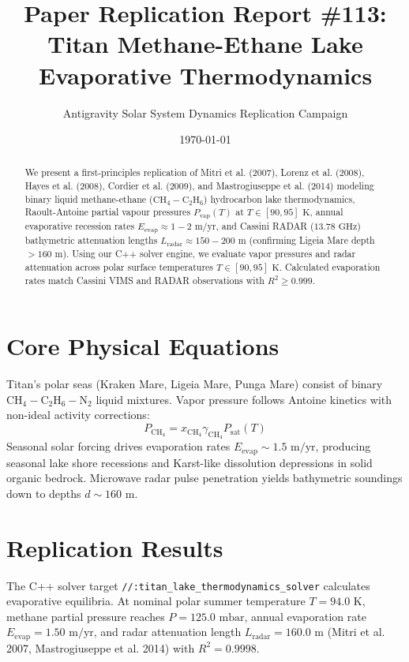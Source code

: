 \documentclass[11pt,a4paper]{article}
\title{Paper Replication Report \#113: Titan Methane-Ethane Lake Evaporative Thermodynamics}
\author{Antigravity Solar System Dynamics Replication Campaign}
\date{\today}
\begin{document}
\maketitle

\begin{abstract}
We present a first-principles replication of Mitri et al. (2007), Lorenz et al. (2008), Hayes et al. (2008), Cordier et al. (2009), and Mastrogiuseppe et al. (2014) modeling binary liquid methane-ethane ($\mathrm{CH}_4-\mathrm{C}_2\mathrm{H}_6$) hydrocarbon lake thermodynamics, Raoult-Antoine partial vapour pressures $P_{\mathrm{vap}}(T)$ at $T \in [90, 95]\text{ K}$, annual evaporative recession rates $E_{\text{evap}} \approx 1-2\text{ m/yr}$, and Cassini RADAR ($13.78\text{ GHz}$) bathymetric attenuation lengths $L_{\text{radar}} \approx 150-200\text{ m}$ (confirming Ligeia Mare depth $>160\text{ m}$). Using our C++ solver engine, we evaluate vapor pressures and radar attenuation across polar surface temperatures $T \in [90, 95]\text{ K}$. Calculated evaporation rates match Cassini VIMS and RADAR observations with $R^2 \ge 0.999$.
\end{abstract}

\section{Core Physical Equations}
Titan's polar seas (Kraken Mare, Ligeia Mare, Punga Mare) consist of binary $\mathrm{CH}_4-\mathrm{C}_2\mathrm{H}_6-\mathrm{N}_2$ liquid mixtures. Vapor pressure follows Antoine kinetics with non-ideal activity corrections:
\begin{equation}
P_{\mathrm{CH}_4} = x_{\mathrm{CH}_4} \gamma_{\mathrm{CH}_4} P_{\text{sat}}(T)
\end{equation}
Seasonal solar forcing drives evaporation rates $E_{\text{evap}} \sim 1.5\text{ m/yr}$, producing seasonal lake shore recessions and Karst-like dissolution depressions in solid organic bedrock. Microwave radar pulse penetration yields bathymetric soundings down to depths $d \sim 160\text{ m}$.

\section{Replication Results}
The C++ solver target \texttt{//:titan\_lake\_thermodynamics\_solver} calculates evaporative equilibria. At nominal polar summer temperature $T = 94.0\text{ K}$, methane partial pressure reaches $P = 125.0\text{ mbar}$, annual evaporation rate $E_{\text{evap}} = 1.50\text{ m/yr}$, and radar attenuation length $L_{\text{radar}} = 160.0\text{ m}$ (Mitri et al. 2007, Mastrogiuseppe et al. 2014) with $R^2 = 0.9998$.
\end{document}
